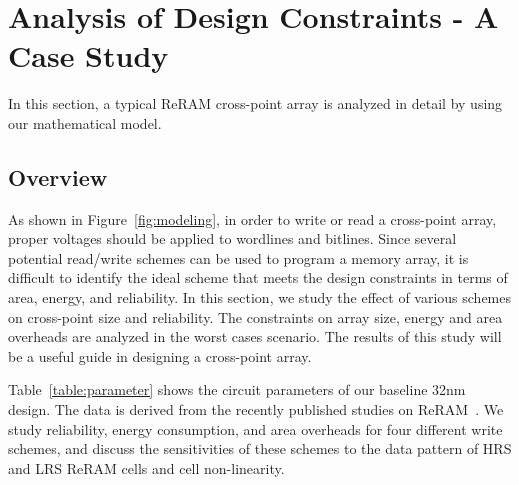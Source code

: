 \vspace{10pt}
\section{Analysis of Design Constraints - A Case Study}\label{sec:w_and_r}

In this section, a typical ReRAM cross-point array is analyzed in detail by using our mathematical model.

\subsection{Overview}
As shown in Figure~\ref{fig:modeling}, in order to write or read a
cross-point array, proper voltages should be applied to
wordlines and bitlines. Since several potential
read/write schemes can be used to program a memory array, it is
difficult to identify the ideal scheme that meets the design constraints in terms of area, energy, and reliability. In this section, we study the effect of various schemes on cross-point size and reliability.
The constraints on array size, energy and area overheads are analyzed in the worst cases scenario. The results of this study will be a useful guide in designing a cross-point array. %


Table~\ref{table:parameter} shows the circuit parameters of our baseline 32nm design. The data is derived from the recently published studies on ReRAM~\cite{crossbar_TED_2010}\cite{memristor:Cong}.
We study %
reliability, energy consumption, and area overheads for four different write
schemes, and discuss the sensitivities of these schemes to the data
pattern of HRS and LRS ReRAM cells and cell non-linearity.


